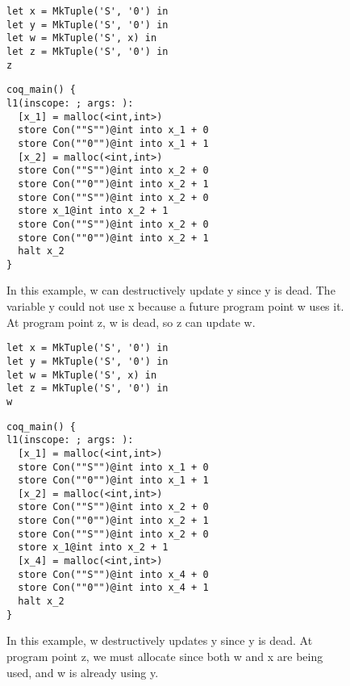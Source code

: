\documentclass{article}
\begin{document}
\begin{figure}
\centering
\begin{minipage}[t]{.4\textwidth}
\begin{lstlisting}
let x = MkTuple('S', '0') in
let y = MkTuple('S', '0') in
let w = MkTuple('S', x) in
let z = MkTuple('S', '0') in
z
\end{lstlisting}
\end{minipage}
\hspace{20pt}
\begin{minipage}[t]{.4\textwidth}
\begin{lstlisting}
coq_main() {
l1(inscope: ; args: ):
  [x_1] = malloc(<int,int>)
  store Con(""S"")@int into x_1 + 0
  store Con(""0"")@int into x_1 + 1
  [x_2] = malloc(<int,int>)
  store Con(""S"")@int into x_2 + 0
  store Con(""0"")@int into x_2 + 1
  store Con(""S"")@int into x_2 + 0
  store x_1@int into x_2 + 1
  store Con(""S"")@int into x_2 + 0
  store Con(""0"")@int into x_2 + 1
  halt x_2
}
\end{lstlisting}
\end{minipage}
\label{fig:dupdate2}
\caption{In this example, w can destructively update y since y is
  dead. The variable y could not use x because a future program point
  w uses it. At program point z, w is dead, so z can update w. }
\end{figure}

\begin{figure}
\centering
\begin{minipage}[t]{.4\textwidth}
\begin{lstlisting}
let x = MkTuple('S', '0') in
let y = MkTuple('S', '0') in
let w = MkTuple('S', x) in
let z = MkTuple('S', '0') in
w
\end{lstlisting}
\end{minipage}
\hspace{20pt}
\begin{minipage}[t]{.4\textwidth}
\begin{lstlisting}
coq_main() {
l1(inscope: ; args: ):
  [x_1] = malloc(<int,int>)
  store Con(""S"")@int into x_1 + 0
  store Con(""0"")@int into x_1 + 1
  [x_2] = malloc(<int,int>)
  store Con(""S"")@int into x_2 + 0
  store Con(""0"")@int into x_2 + 1
  store Con(""S"")@int into x_2 + 0
  store x_1@int into x_2 + 1
  [x_4] = malloc(<int,int>)
  store Con(""S"")@int into x_4 + 0
  store Con(""0"")@int into x_4 + 1
  halt x_2
}
\end{lstlisting}
\end{minipage}
\label{fig:dupdate3}
\caption{In this example, w destructively updates y since y is
  dead. At program point z, we must allocate since both w and x are
  being used, and w is already using y. }
\end{figure}
\end{document}

